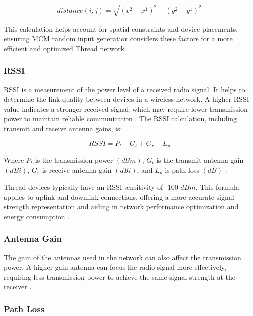 \begin{equation}\label{eq:euclidean_distance}
    distance\left(i,j\right)=\sqrt{\left(x^2-x^1\right)^2+\left(y^2-y^1\right)^2}
\end{equation}

This calculation helps account for spatial constraints and device placements, ensuring \gls{MCM} random input generation considers these factors for a more efficient and optimized Thread network \cite{dokmanic2015euclidean}.

\subsubsection{\acrlong{RSSI}}

\acrfull{RSSI} is a measurement of the power level of a received radio signal. It helps to determine the link quality between devices in a wireless network. A higher \gls{RSSI} value indicates a stronger received signal, which may require lower transmission power to maintain reliable communication \cite{benkic2008rssi}. The \gls{RSSI} calculation, including transmit and receive antenna gains, is:

\begin{equation}\label{eq:rssi}
    RSSI=P_t+G_t+G_r-L_p
\end{equation}

Where $P_t$ is the transmission power $\left(dBm\right)$, $G_t$ is the transmit antenna gain $\left(dBi\right)$, $G_r$ is receive antenna gain $\left(dBi\right)$, and $L_p$ is path loss $\left(dB\right)$ \cite{doi:10.1155/2014/371350}.

Thread devices typically have an \gls{RSSI} sensitivity of -100 $dBm$. This formula applies to uplink and downlink connections, offering a more accurate signal strength representation and aiding in network performance optimization and energy consumption \cite{semiconductor_nrf52840_2018_1}.

\subsubsection{Antenna Gain}

The gain of the antennas used in the network can also affect the transmission power. A higher gain antenna can focus the radio signal more effectively, requiring less transmission power to achieve the same signal strength at the receiver \cite{wu2014study}.

\subsubsection{Path Loss}

